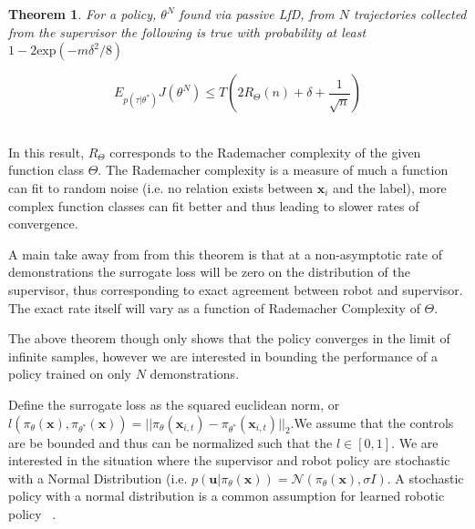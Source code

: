 \documentclass[10pt, conference]{ieeeconf}      %
\newtheorem{theorem}{Theorem}[section]
\newcommand{\bu}{\mathbf{u}}
\newcommand{\bx}{\mathbf{x}}
\begin{document}
\begin{theorem}\label{thm:sup}
For a policy, $\theta^N$ found via passive LfD, from $N$ trajectories collected from the supervisor the following is true with probability at least $1- 2\mbox{exp} (-m\delta^2/8)$

$$E_{p(\tau|\theta^*)} J(\theta^N)\leq T( 2R_{\Theta}(n) + \delta+ \frac{1}{\sqrt{n}})$$\\

\end{theorem}

In this result, $R_{\Theta}$ corresponds to the Rademacher complexity of the given function class $\Theta$. The Rademacher complexity is a measure of much a function can fit to random noise (i.e. no relation exists between $\bx_i$ and the label), more complex function classes can fit better and thus leading to slower rates of convergence.

A main take away from from this theorem  is that at a non-asymptotic rate of demonstrations the surrogate loss will be zero on the distribution of the supervisor, thus corresponding to exact agreement between robot and supervisor. The exact rate itself will vary as a function of Rademacher Complexity of $\Theta$. 

The above theorem though only shows that the policy converges in the limit of infinite samples, however we are interested in bounding the performance of a policy trained on only $N$ demonstrations. 

 Define the surrogate loss as the squared euclidean norm, or $l(\pi_{\theta}(\bx),\pi_{\theta^*}(\bx)) = ||\pi_{\theta}(\bx_{i,t}) - \pi_{\theta^*}(\bx_{i,t})||_2$.We assume that the controls are be bounded and thus can be normalized such that the $l \in [0,1]$.  We are interested in the situation where the supervisor and robot policy are stochastic with a Normal Distribution (i.e. $p(\bu|\pi_{\theta}(\bx)) = \mathcal{N}(\pi_\theta(\bx),\sigma I)$. A stochastic policy with a normal distribution is a common assumption for learned robotic policy ~\cite{levine2015end}. 
 
\end{document}
